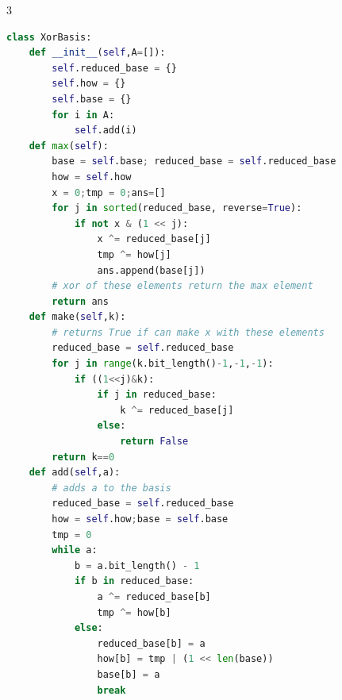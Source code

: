 \documentclass[10pt,landscape, a4paper]{article}
\begin{document}
\begin{multicols*}{3}
\begin{lstlisting}[language=Python]
class XorBasis:
    def __init__(self,A=[]):
        self.reduced_base = {}
        self.how = {}
        self.base = {}
        for i in A:
            self.add(i)
    def max(self):
        base = self.base; reduced_base = self.reduced_base
        how = self.how
        x = 0;tmp = 0;ans=[]
        for j in sorted(reduced_base, reverse=True):
            if not x & (1 << j):
                x ^= reduced_base[j]
                tmp ^= how[j]
                ans.append(base[j])
        # xor of these elements return the max element
        return ans
    def make(self,k):
        # returns True if can make x with these elements
        reduced_base = self.reduced_base
        for j in range(k.bit_length()-1,-1,-1):
            if ((1<<j)&k):
                if j in reduced_base:
                    k ^= reduced_base[j]
                else:
                    return False
        return k==0
    def add(self,a):
        # adds a to the basis
        reduced_base = self.reduced_base
        how = self.how;base = self.base
        tmp = 0
        while a:
            b = a.bit_length() - 1
            if b in reduced_base:
                a ^= reduced_base[b]
                tmp ^= how[b]
            else:
                reduced_base[b] = a
                how[b] = tmp | (1 << len(base))
                base[b] = a
                break


\end{lstlisting}
\end{multicols*}
\end{document}
